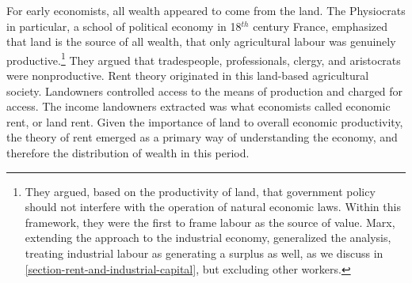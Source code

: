 For early economists, all wealth appeared to come from the land. The Physiocrats in particular, a school of \gls{political economy} in 18$^{th}$ century France, emphasized that land is the source of all wealth, that only agricultural labour was genuinely productive.\footnote{They argued, based on the productivity of land, that government policy should not interfere with the operation of natural economic laws. Within this framework, they were the first to frame labour as the source of value. Marx, extending the approach to the industrial economy, generalized the analysis, treating industrial labour as generating a surplus as well, as we discuss in \ref{section-rent-and-industrial-capital}, but excluding other workers.} They argued that tradespeople, professionals, clergy, and aristocrats were nonproductive. 
Rent theory originated in this land-based agricultural society. Landowners controlled access to the means of production and charged for access. 
The income landowners extracted was what economists called \gls{economic rent}, or \gls{land rent}.
Given the importance of land to overall economic productivity, the theory of rent emerged as a primary way of understanding the economy, and therefore the distribution of wealth in this period.

